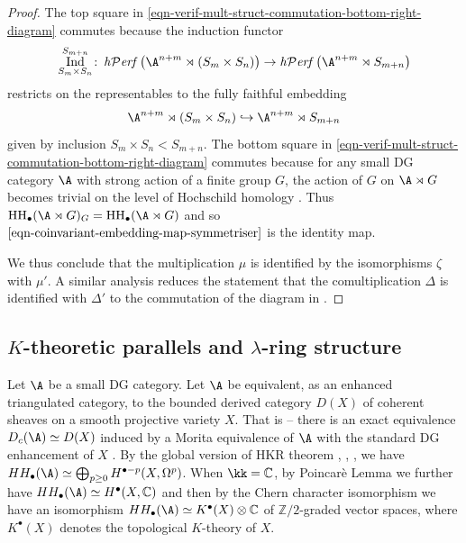\documentclass[12pt,a4paper,reqno]{amsart}
\DeclareMathOperator{\hperf}{{\it h\mathcal{P}erf}}
\DeclareMathOperator{\hochhom}{{HH}}
\DeclareMathOperator\Ind{{Ind}}     %
\begin{document}
\begin{proof}
The top square in 
\eqref{eqn-verif-mult-struct-commutation-bottom-right-diagram}
commutes because the induction functor 
$$
\Ind_{S_m \times S_n}^{S_{m+n}}\colon 
\hperf\left(\A^{n+m} \rtimes (S_m \times S_n)\right)
\rightarrow 
\hperf\left(\A^{n+m} \rtimes S_{m+n} \right)
$$
restricts on the representables to the fully faithful embedding
$$
\A^{n+m} \rtimes (S_m \times S_n)
\hookrightarrow 
\A^{n+m} \rtimes S_{m+n}
$$ 
given by inclusion $S_m \times S_n < S_{m+n}$. The bottom square in 
\eqref{eqn-verif-mult-struct-commutation-bottom-right-diagram}
commutes because for any small DG category $\A$ with strong
action of a finite group $G$, 
the action of $G$ on $\A \rtimes G$ becomes trivial on 
the level of Hochschild homology 
\cite[Lemma
5.15]{GyengeLogvinenko-TheHeisenbergAlgebraOfAVectorSpaceAndHochschildHomology}.
Thus $\hochhom_\bullet(\A \rtimes G)_G = \hochhom_\bullet(\A \rtimes G)$
and so $\eqref{eqn-coinvariant-embedding-map-symmetriser}$ is the identity map.    

We thus conclude that the multiplication $\mu$ is identified by
the isomorphisms $\zeta$ with $\mu'$. A similar analysis reduces 
the statement that the comultiplication $\Delta$ is identified with 
$\Delta'$ to the commutation of the diagram in 
\cite[Lemma
5.18]{GyengeLogvinenko-TheHeisenbergAlgebraOfAVectorSpaceAndHochschildHomology}. 
\end{proof}

\subsection{$K$-theoretic parallels and $\lambda$-ring structure}
\label{section-k-theoretic-parallels-and-lambda-ring-structure}

Let $\A$ be a small DG category. Let $\A$ be equivalent,  
as an enhanced triangulated category, to the
bounded derived category $D(X)$ of coherent sheaves on a smooth 
projective variety $X$. That is -- there is
an exact equivalence $D_c(\A) \simeq D(X)$ induced by
a Morita equivalence of $\A$ with the standard DG enhancement of $X$
\cite[\S4.4]{GyengeKoppensteinerLogvinenko-TheHeisenbergCategoryOfACategory}
\cite{Toen-TheHomotopyTheoryOfDGCategoriesAndDerivedMoritaTheory} 
\cite{LuntsOrlov-UniquenessOfEnhancementForTriangulatedCategories}. 
By the global version of HKR theorem 
\cite[Cor 2.6]{Swan-HochschildCohomologyOfQuasiprojectiveSchemes},
\cite[Theorem 4.6.2]{Kontsevich-DeformationQuantizationOfPoissonManifolds}, 
\cite[Theorem 4.9]{Caldararu-TheMukaiPairingIITheHochschildKostantRosenbergIsomorphism},
we have $HH_\bullet(\A) \simeq \bigoplus_{p \geq 0}H^{\bullet - p}(X, \Omega^p)$. When $\kk =
\mathbb{C}$, by Poincar{\`e} Lemma we further have $HH_\bullet(\A) \simeq 
H^\bullet(X,\mathbb{C})$ and then by the Chern character isomorphism 
\cite[\S2.4]{AtiyahHirzebruch-VectorBundlesAndHomogeneousSpaces} 
we have an isomorphism
$HH_\bullet(\A) \simeq K^\bullet(X) \otimes \mathbb{C}$
of $\mathbb{Z}/2$-graded vector spaces,
where $K^\bullet(X)$ denotes the topological $K$-theory of $X$.
\end{document}
